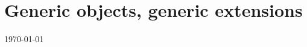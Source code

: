 \cfoot{}\rhead{\thepage}

%


\thispagestyle{empty}

\section{Generic objects, generic extensions}\label{chapter_generic}

{\tiny \today } \\[0.5cm]


